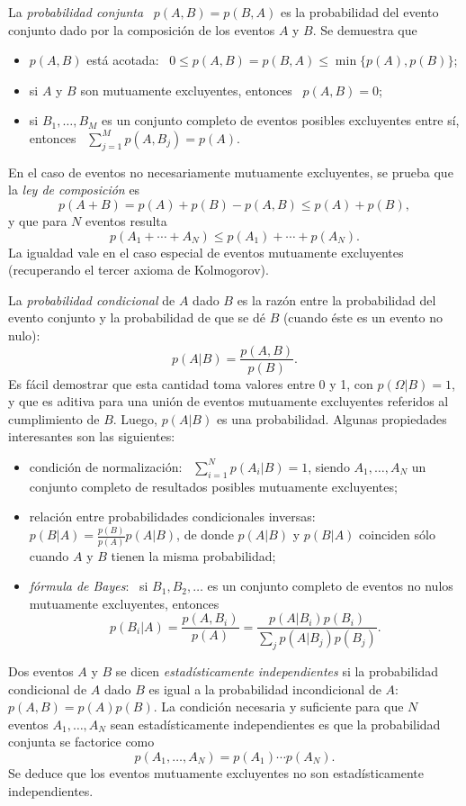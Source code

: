 La \emph{probabilidad conjunta} \  $p(A,B)=p(B,A)$ es la probabilidad del evento
conjunto dado por la composici\'on de los eventos $A$ y $B$. Se demuestra que
%
\begin{itemize}
\item $p(A,B)$ est\'a acotada: \ $0\leq p(A,B)=p(B,A)\leq \min\{p(A),p(B)\}$;
%
\item si $A$ y $B$ son mutuamente excluyentes, entonces \ $p(A,B)=0$;
%
\item  si  $B_1,  \ldots, B_M$  es  un  conjunto  completo de  eventos  posibles
  excluyentes entre s\'i, %
  entonces \ $\sum_{j=1}^M p(A,B_j)=p(A)$.
\end{itemize}

En el caso de eventos no necesariamente mutuamente excluyentes, se prueba que la
\emph{ley de composici\'on} es
%
$$
p(A+B)=p(A)+p(B)-p(A,B)\leq p(A)+p(B) , 
$$ 
%
y que para $N$ eventos resulta 
%
$$
p(A_1+\cdots+A_N)\leq p(A_1)+\cdots+p(A_N) . 
$$ 
%
La  igualdad  vale  en  el  caso  especial  de  eventos  mutuamente  excluyentes
(recuperando el tercer axioma de Kolmogorov).

La  \emph{probabilidad condicional}  de  $A$ dado  $B$  es la  raz\'on entre  la
probabilidad del  evento conjunto y la  probabilidad de que se  d\'e $B$ (cuando
\'este es un evento no nulo):
%
$$
p(A|B)=\frac{p(A,B)}{p(B)} .
$$ 
%
Es f\'acil demostrar %
que  esta cantidad  toma valores  entre 0  y 1,  con $p(\Omega|B)=1$,  y  que es
aditiva  para  una  uni\'on  de  eventos  mutuamente  excluyentes  referidos  al
cumplimiento de  $B$. Luego, $p(A|B)$  es una probabilidad.  Algunas propiedades
interesantes son las siguientes:
%
\begin{itemize}
\item  condici\'on  de  normalizaci\'on:  \  $\sum_{i=1}^N  p(A_i|B)=1$,  siendo
  $A_1,\ldots,A_N$  un  conjunto  completo  de  resultados  posibles  mutuamente
  excluyentes;
%
\item    relaci\'on    entre    probabilidades   condicionales    inversas:    \
  $p(B|A)=\frac{p(B)}{p(A)}  p(A|B)$,  de donde  $p(A|B)$  y $p(B|A)$  coinciden
  s\'olo cuando $A$ y $B$ tienen la misma probabilidad;
%
\item \emph{f\'ormula de Bayes}: \ si $B_1, B_2, \ldots$ es un conjunto completo
  de eventos no nulos mutuamente excluyentes, entonces
  $$
  p(B_i|A)=\frac{p(A,B_i)}{p(A)}   =   \frac{p(A|B_i)  p(B_i)}{\sum_j   p(A|B_j)
    p(B_j)} .
  $$ 
\end{itemize}

Dos eventos  $A$ y $B$  se dicen \emph{estad\'isticamente independientes}  si la
probabilidad  condicional   de  $A$  dado   $B$  es  igual  a   la  probabilidad
incondicional  de  $A$:  \   $p(A,B)=p(A)  p(B)$.  La  condici\'on  necesaria  y
suficiente  para  que   $N$  eventos  $A_1,\ldots,A_N$  sean  estad\'isticamente
independientes es que la probabilidad conjunta se factorice como
%
$$
p(A_1,\ldots,A_N)=p(A_1) \cdots p(A_N) .
$$
%
Se  deduce que  los  eventos mutuamente  excluyentes  no son  estad\'isticamente
independientes.

\cite{ManWol95}